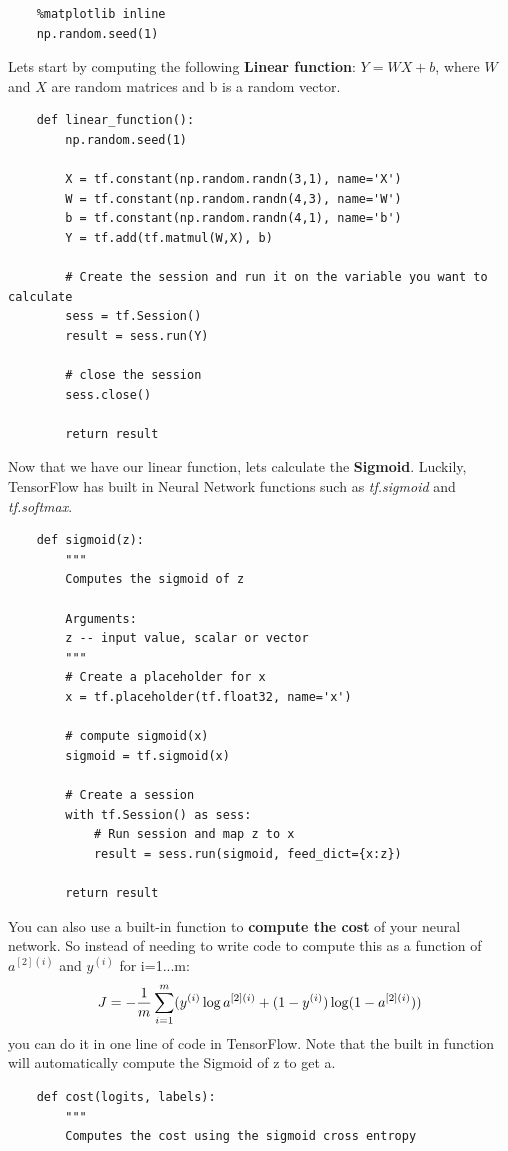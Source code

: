 \documentclass[11pt, a4paper]{article}
\begin{document}
\begin{spacing}{1.1}
\begin{lstlisting}
	%matplotlib inline
	np.random.seed(1)\end{lstlisting} \vspace*{1mm}	
	Lets start by computing the following \textbf{Linear function}: $Y = WX + b$, where $W$ and $X$ are random matrices and b is a random vector. 
	\begin{lstlisting}
	def linear_function():		
		np.random.seed(1)
		
		X = tf.constant(np.random.randn(3,1), name='X')
		W = tf.constant(np.random.randn(4,3), name='W')
		b = tf.constant(np.random.randn(4,1), name='b')
		Y = tf.add(tf.matmul(W,X), b)
		
		# Create the session and run it on the variable you want to calculate
		sess = tf.Session()
		result = sess.run(Y)
		
		# close the session 
		sess.close()
		
		return result	\end{lstlisting} \vspace*{1mm}
	Now that we have our linear function, lets calculate the \textbf{Sigmoid}. Luckily, TensorFlow has built in Neural Network functions such as \textit{tf.sigmoid} and \textit{tf.softmax}.
	\begin{lstlisting}
	def sigmoid(z):
		"""
		Computes the sigmoid of z
		
		Arguments:
		z -- input value, scalar or vector
		"""
		# Create a placeholder for x
		x = tf.placeholder(tf.float32, name='x')
		
		# compute sigmoid(x)
		sigmoid = tf.sigmoid(x)
		
		# Create a session
		with tf.Session() as sess:
			# Run session and map z to x
			result = sess.run(sigmoid, feed_dict={x:z})
		
		return result \end{lstlisting} \newpage

	\noindent You can also use a built-in function to \textbf{compute the cost} of your neural network. So instead of needing to write code to compute this as a function of $a^{[2](i)}$ and $y^{(i)}$ for i=1...m: 
	$$ J = - \frac{1}{m}  \sum_{i = 1}^m  \large ( \small y^{(i)} \log a^{ [2] (i)} + (1-y^{(i)})\log (1-a^{ [2] (i)} )\large )\small$$
	you can do it in one line of code in TensorFlow. Note that the built in function will automatically compute the Sigmoid of z to get a.
	\begin{lstlisting}
	def cost(logits, labels):
		"""
		Computes the cost using the sigmoid cross entropy
		

\end{lstlisting}
\end{spacing}
\end{document}
